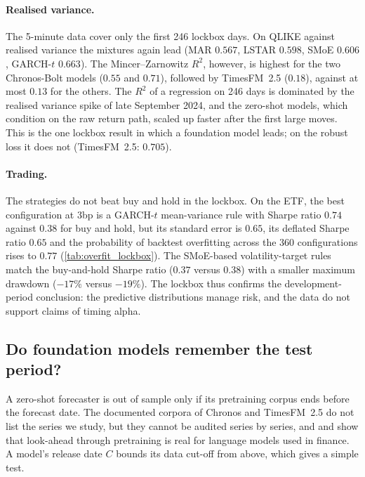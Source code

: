 \paragraph{Realised variance.} The 5-minute data cover only the first 246 lockbox days. On QLIKE against
realised variance the mixtures again lead (MAR $0.567$, LSTAR $0.598$, SMoE $0.606$, GARCH-$t$ $0.663$).
The Mincer--Zarnowitz $R^2$, however, is highest for the two Chronos-Bolt models ($0.55$ and $0.71$),
followed by TimesFM~2.5 ($0.18$), against at most $0.13$ for the others. The $R^2$ of a regression on 246 days is dominated by the realised
variance spike of late September 2024, and the zero-shot models, which condition on the raw return path,
scaled up faster after the first large moves. This is the one lockbox result in which a foundation
model leads; on the robust loss it does not (TimesFM~2.5: $0.705$).


\paragraph{Trading.} The strategies do not beat buy and hold in the lockbox. On the ETF, the best
configuration at 3bp is a GARCH-$t$ mean-variance rule with Sharpe ratio $0.74$ against $0.38$ for buy
and hold, but its standard error is $0.65$, its deflated Sharpe ratio $0.65$ and the probability of
backtest overfitting across the 360 configurations rises to $0.77$ (\cref{tab:overfit_lockbox}). The
SMoE-based volatility-target rules match the buy-and-hold Sharpe ratio ($0.37$ versus $0.38$) with a
smaller maximum drawdown ($-17\%$ versus $-19\%$). The lockbox thus confirms the development-period
conclusion: the predictive distributions manage risk, and the data do not support claims of timing
alpha.




\subsection{Do foundation models remember the test period?}\label{sec:fm-release}

A zero-shot forecaster is out of sample only if its pretraining corpus ends before the forecast
date. The documented corpora of Chronos and TimesFM~2.5 do not list the series we study, but
they cannot be audited series by series, and \citet{sarkar2024lookahead} and
\citet{glasserman2024assessing} show that look-ahead through pretraining is real for language
models used in finance. A model's release date $C$ bounds its data cut-off from above, which gives a
simple test.


